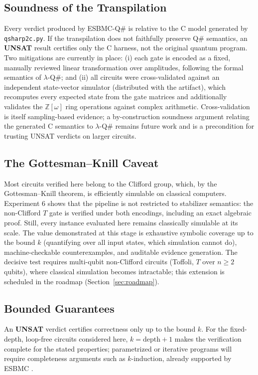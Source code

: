 \documentclass[journal]{IEEEtran} %
\begin{document}
\subsection{Soundness of the Transpilation}
Every verdict produced by ESBMC-Q\# is relative to the C model generated by \texttt{qsharp2c.py}. If the transpilation does not faithfully preserve Q\# semantics, an \textbf{UNSAT} result certifies only the C harness, not the original quantum program. Two mitigations are currently in place: (i) each gate is encoded as a fixed, manually reviewed linear transformation over amplitudes, following the formal semantics of $\lambda$-Q\#; and (ii) all circuits were cross-validated against an independent state-vector simulator (distributed with the artifact), which recomputes every expected state from the gate matrices and additionally validates the $\mathbb{Z}[\omega]$ ring operations against complex arithmetic. Cross-validation is itself sampling-based evidence; a by-construction soundness argument relating the generated C semantics to $\lambda$-Q\# remains future work and is a precondition for trusting UNSAT verdicts on larger circuits.

\subsection{The Gottesman--Knill Caveat}
Most circuits verified here belong to the Clifford group, which, by the Gottesman--Knill theorem, is efficiently simulable on classical computers. Experiment 6 shows that the pipeline is not restricted to stabilizer semantics: the non-Clifford $T$ gate is verified under both encodings, including an exact algebraic proof. Still, every instance evaluated here remains classically simulable at its scale. The value demonstrated at this stage is exhaustive symbolic coverage up to the bound $k$ (quantifying over all input states, which simulation cannot do), machine-checkable counterexamples, and auditable evidence generation. The decisive test requires multi-qubit non-Clifford circuits (Toffoli, $T$ over $n \geq 2$ qubits), where classical simulation becomes intractable; this extension is scheduled in the roadmap (Section~\ref{sec:roadmap}).

\subsection{Bounded Guarantees}
An \textbf{UNSAT} verdict certifies correctness only up to the bound $k$. For the fixed-depth, loop-free circuits considered here, $k = \text{depth} + 1$ makes the verification complete for the stated properties; parametrized or iterative programs will require completeness arguments such as $k$-induction, already supported by ESBMC \cite{ref8}.
\end{document}
